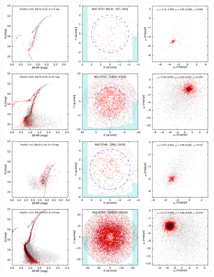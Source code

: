\documentclass[usenatbib]{mnras}
\begin{document}
\clearpage\begin{figure}
\contcaption{}
\includegraphics{figs/NGC_6717_Pal9.pdf}
\includegraphics{figs/NGC_6723.pdf}
\includegraphics{figs/NGC_6749.pdf}
\includegraphics{figs/NGC_6752.pdf}
\end{figure}
\end{document}
